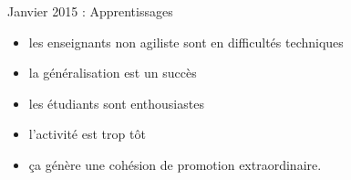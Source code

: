 \documentclass{beamer}
\begin{document}
\begin{frame}{Janvier 2015 : Apprentissages}
  \begin{itemize}
    \item les enseignants non agiliste sont en difficultés techniques
    \item la généralisation est un succès
    \item les étudiants sont enthousiastes
    \item l'activité est trop tôt
    \item ça génère une cohésion de promotion extraordinaire.
  \end{itemize}
\end{frame}

\end{document}
